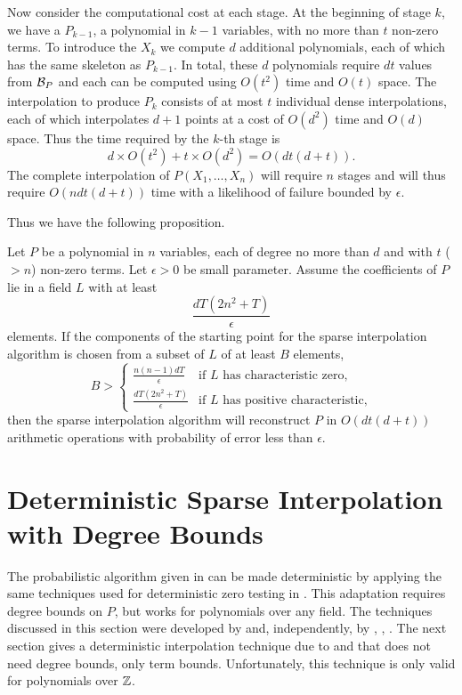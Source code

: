 Now consider the computational cost at each stage.  At the beginning
of stage $k$, we have a $P_{k-1}$, a polynomial in $k-1$ variables,
with no more than $t$ non-zero terms.  To introduce the $X_k$ we
compute $d$ additional polynomials, each of which has the same
skeleton as $P_{k-1}$.  In total, these $d$ polynomials require
$dt$ values from ${\cal B}_P$ and each can be computed using $O(t^2)$
time and $O(t)$ space.  The interpolation to produce $P_k$ consists of
at most $t$ individual dense interpolations, each of which 
interpolates $d+1$ points at a cost of $O(d^2)$ time and $O(d)$ space.
Thus the time required by the $k$-th stage is
\[
d \times O(t^2) + t \times O(d^2) = O(dt(d+t)).
\]
The complete interpolation of $P(X_1, \ldots, X_n)$ will require $n$ stages
and will thus require $O(ndt(d+t))$ time with a likelihood of failure
bounded by $\epsilon$.

Thus we have the following proposition.

\begin{proposition}
Let $P$ be a polynomial in $n$ variables, each of degree no more than $d$
and with $t$ ($> n$) non-zero terms.  Let $\epsilon>0$ be small
parameter.  Assume the coefficients of $P$ lie in
a field $L$ with at least 
\[
\frac{dT(2n^2 +T)}{\epsilon}
\]
elements.  If the components of the starting point for the sparse
interpolation algorithm is chosen from a subset of $L$ of at
least $B$ elements,
\[
B > \begin{cases}
\displaystyle\frac{n(n-1)dT}{\epsilon} & \text{if $L$ has characteristic zero,} \\
\displaystyle\frac{dT(2n^2 +T)}{\epsilon} & \text{if $L$ has positive characteristic,}
\end{cases}
\]
then the sparse interpolation algorithm will reconstruct $P$ in
$O(dt(d+t))$ arithmetic operations with probability of error less than
$\epsilon$.  
\end{proposition}

\section{Deterministic Sparse Interpolation with Degree Bounds}
\label{Interp:ZSparse:Sec}

The probabilistic algorithm given in  can
be made deterministic by applying the same techniques used for 
deterministic zero testing in . 
This adaptation requires degree bounds on $P$, but works for polynomials
over any field.  The techniques discussed in this section were
developed by {\Zippel} \cite{Zippel1990-ab} and, independently, by
{\Grigoriev}, {\Karpinski}, {\Singer} \cite{Grigorev1994-xo}.  The next
section gives a deterministic interpolation technique due to {\BenOr}
and {\Tiwari} that does not need degree bounds, only term bounds.
Unfortunately, this technique is only valid for polynomials over $\mathbb{Z}$.

